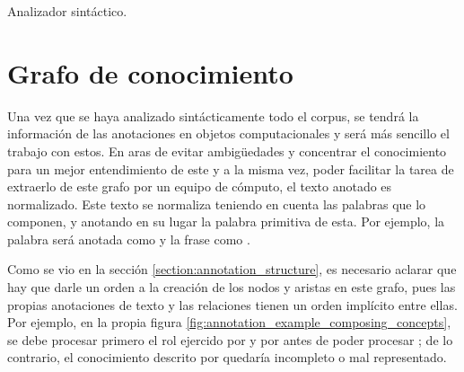 \begin{algorithm}[H]
	\caption[Analizador sintáctico]{Analizador sintáctico.}\label{algorithm:annotation_file_parsing}
	\BlankLine
\end{algorithm}

\section{Grafo de conocimiento}
Una vez que se haya analizado sintácticamente todo el corpus, se tendrá la información de las anotaciones en objetos computacionales y será más sencillo el trabajo con estos. En aras de evitar ambigüedades y concentrar el conocimiento para un mejor entendimiento de este y a la misma vez, poder facilitar la tarea de extraerlo de este grafo por un equipo de cómputo, el texto anotado es normalizado. Este texto se normaliza teniendo en cuenta las palabras que lo componen, y anotando en su lugar la palabra primitiva de esta. Por ejemplo, la palabra  será anotada como  y la frase  como .

Como se vio en la sección \ref{section:annotation_structure}, es necesario aclarar que hay que darle un orden a la creación de los nodos y aristas en este grafo, pues las propias anotaciones de texto y las relaciones tienen un orden implícito entre ellas. Por ejemplo, en la propia figura \ref{fig:annotation_example_composing_concepts}, se debe procesar primero el rol ejercido por  y por  antes de poder procesar ; de lo contrario, el conocimiento descrito por  quedaría incompleto o mal representado.


